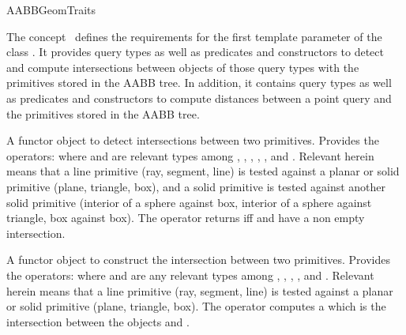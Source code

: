 \ccRefPageBegin


\begin{ccRefConcept}{AABBGeomTraits}


\ccDefinition
  
The concept \ccRefName\ defines the requirements for the first template parameter of the class . It provides query types as well as predicates and constructors to detect and compute intersections between objects of those query types with the primitives stored in the AABB tree. In addition, it contains query types as well as predicates and constructors to compute distances between a point query and the primitives stored in the AABB tree.

\ccTypes


{A functor object to detect intersections between two primitives.
Provides the operators:
where  and  are relevant types
among , , , , ,  and . Relevant herein means that a line primitive (ray, segment, line) is tested against a planar or solid primitive (plane, triangle, box), and a solid primitive is tested against another solid primitive (interior of a sphere against box, interior of a sphere against triangle, box against box). The operator returns  iff  and  have a non empty intersection.}

{A functor object to construct the intersection between two primitives.
Provides the operators:
 where  and  are any relevant types among , , ,  ,  and . Relevant herein means that a line primitive (ray, segment, line) is tested against a planar or solid primitive (plane, triangle, box). The operator computes a  which is the intersection between the objects  and .}


\end{ccRefConcept}
